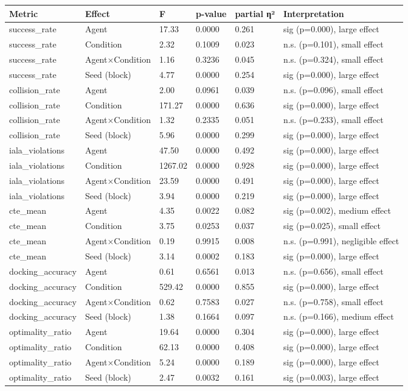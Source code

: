 \begin{tabular}{llllll}
\toprule
Metric & Effect & F & p-value & partial η² & Interpretation \\
\midrule
success\_rate & Agent & 17.33 & 0.0000 & 0.261 & sig (p=0.000), large effect \\
success\_rate & Condition & 2.32 & 0.1009 & 0.023 & n.s. (p=0.101), small effect \\
success\_rate & Agent×Condition & 1.16 & 0.3236 & 0.045 & n.s. (p=0.324), small effect \\
success\_rate & Seed (block) & 4.77 & 0.0000 & 0.254 & sig (p=0.000), large effect \\
collision\_rate & Agent & 2.00 & 0.0961 & 0.039 & n.s. (p=0.096), small effect \\
collision\_rate & Condition & 171.27 & 0.0000 & 0.636 & sig (p=0.000), large effect \\
collision\_rate & Agent×Condition & 1.32 & 0.2335 & 0.051 & n.s. (p=0.233), small effect \\
collision\_rate & Seed (block) & 5.96 & 0.0000 & 0.299 & sig (p=0.000), large effect \\
iala\_violations & Agent & 47.50 & 0.0000 & 0.492 & sig (p=0.000), large effect \\
iala\_violations & Condition & 1267.02 & 0.0000 & 0.928 & sig (p=0.000), large effect \\
iala\_violations & Agent×Condition & 23.59 & 0.0000 & 0.491 & sig (p=0.000), large effect \\
iala\_violations & Seed (block) & 3.94 & 0.0000 & 0.219 & sig (p=0.000), large effect \\
cte\_mean & Agent & 4.35 & 0.0022 & 0.082 & sig (p=0.002), medium effect \\
cte\_mean & Condition & 3.75 & 0.0253 & 0.037 & sig (p=0.025), small effect \\
cte\_mean & Agent×Condition & 0.19 & 0.9915 & 0.008 & n.s. (p=0.991), negligible effect \\
cte\_mean & Seed (block) & 3.14 & 0.0002 & 0.183 & sig (p=0.000), large effect \\
docking\_accuracy & Agent & 0.61 & 0.6561 & 0.013 & n.s. (p=0.656), small effect \\
docking\_accuracy & Condition & 529.42 & 0.0000 & 0.855 & sig (p=0.000), large effect \\
docking\_accuracy & Agent×Condition & 0.62 & 0.7583 & 0.027 & n.s. (p=0.758), small effect \\
docking\_accuracy & Seed (block) & 1.38 & 0.1664 & 0.097 & n.s. (p=0.166), medium effect \\
optimality\_ratio & Agent & 19.64 & 0.0000 & 0.304 & sig (p=0.000), large effect \\
optimality\_ratio & Condition & 62.13 & 0.0000 & 0.408 & sig (p=0.000), large effect \\
optimality\_ratio & Agent×Condition & 5.24 & 0.0000 & 0.189 & sig (p=0.000), large effect \\
optimality\_ratio & Seed (block) & 2.47 & 0.0032 & 0.161 & sig (p=0.003), large effect \\
\bottomrule
\end{tabular}
